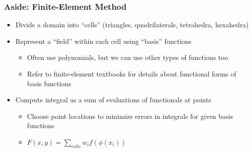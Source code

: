 \documentclass[aspectratio=169]{beamer}
\begin{document}
\begin{frame}
  \frametitle{Aside: Finite-Element Method}

  \begin{itemize}
  \item Divide a domain into ``cells'' (triangles, quadrilaterals, tetrahedra, hexahedra)
  \item Represent a ``field'' within each cell using ``basis'' functions
    \begin{itemize}
    \item Often use polynomials, but we can use other types of functions too
    \item Refer to finite-element textbooks for details about functional forms of basis functions
  \end{itemize}
  \item Compute integral as a sum of evaluations of functionals at points
    \begin{itemize}
    \item Choose point locations to minimize errors in integrals for given basis functions
    \item $F(x,y) = \sum_\mathit{cells} w_i f(\phi(x_i))$
    \end{itemize}
  \end{itemize}

\end{frame}
\end{document}
